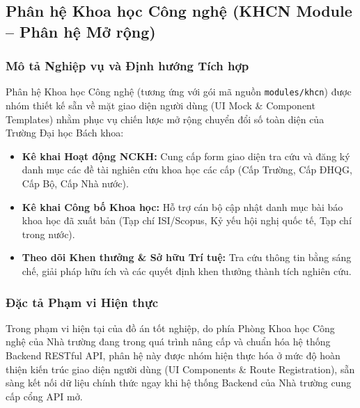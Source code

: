 \subsection{Phân hệ Khoa học Công nghệ (KHCN Module -- Phân hệ Mở rộng)}
\label{subsec:module_khcn}

\subsubsection{Mô tả Nghiệp vụ và Định hướng Tích hợp}
Phân hệ Khoa học Công nghệ (tương ứng với gói mã nguồn \texttt{modules/khcn}) được nhóm thiết kế sẵn về mặt giao diện người dùng (UI Mock \& Component Templates) nhằm phục vụ chiến lược mở rộng chuyển đổi số toàn diện của Trường Đại học Bách khoa:

\begin{itemize}
    \item \textbf{Kê khai Hoạt động NCKH:} Cung cấp form giao diện tra cứu và đăng ký danh mục các đề tài nghiên cứu khoa học các cấp (Cấp Trường, Cấp ĐHQG, Cấp Bộ, Cấp Nhà nước).
    \item \textbf{Kê khai Công bố Khoa học:} Hỗ trợ cán bộ cập nhật danh mục bài báo khoa học đã xuất bản (Tạp chí ISI/Scopus, Kỷ yếu hội nghị quốc tế, Tạp chí trong nước).
    \item \textbf{Theo dõi Khen thưởng \& Sở hữu Trí tuệ:} Tra cứu thông tin bằng sáng chế, giải pháp hữu ích và các quyết định khen thưởng thành tích nghiên cứu.
\end{itemize}

\subsubsection{Đặc tả Phạm vi Hiện thực}
Trong phạm vi hiện tại của đồ án tốt nghiệp, do phía Phòng Khoa học Công nghệ của Nhà trường đang trong quá trình nâng cấp và chuẩn hóa hệ thống Backend RESTful API, phân hệ này được nhóm hiện thực hóa ở mức độ hoàn thiện kiến trúc giao diện người dùng (UI Components \& Route Registration), sẵn sàng kết nối dữ liệu chính thức ngay khi hệ thống Backend của Nhà trường cung cấp cổng API mở.
